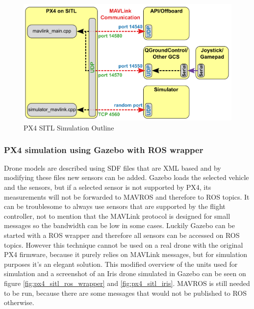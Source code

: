 \begin{figure}[h]
    \centering
    \includegraphics[width=120mm, keepaspectratio]{figures/px4_sitl_overview.png}
    \caption{PX4 SITL Simulation Outline \cite{PX4Simulation}}
    \label{fig:px4_sitl_simulation}
\end{figure}

\subsubsection{PX4 simulation using Gazebo with ROS wrapper}

Drone models are described using SDF files that are XML based and by modifying these files new sensors can 
be added. Gazebo loads the selected vehicle and the sensors, but if a selected sensor is not supported by
PX4, its measurements will not be forwarded to MAVROS and therefore to ROS topics. It can be troublesome 
to always use sensors that are supported by the flight controller, not to mention that the MAVLink protocol 
is designed for small messages so the bandwidth can be low in some cases. Luckily Gazebo can 
be started with a ROS wrapper and therefore all sensors can be accessed on ROS topics. However this technique
cannot be used on a real drone with the original PX4 firmware, because it purely relies on MAVLink messages, 
but for simulation purposes it's an elegant solution. This modified overview of the units used for simulation
and a screenshot of an Iris drone simulated in Gazebo can be seen on figure \ref{fig:px4_sitl_ros_wrapper} and 
\ref{fig:px4_sitl_iris}. 
MAVROS is still needed to be run, because there are some messages that would not be published to ROS otherwise.

